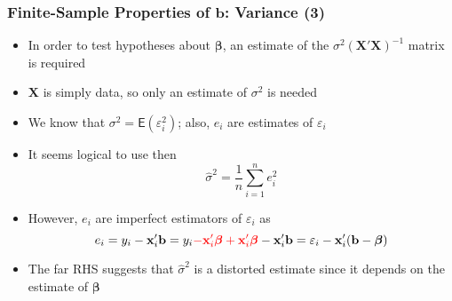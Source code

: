 \documentclass[10pt]{beamer}
\newcommand{\var}{\mathsf{Var}}
\newcommand{\E}{\mathsf{E}}
\theoremstyle{definition}
\begin{document}
\iffalse
\begin{frame}[fragile]
	\frametitle{Finite-Sample Properties of $\mathbf{b}$: Estimation of Variance}
	\begin{itemize}
		\item In the empirical context, the unbiased estimator of the (conditional and unconditional) variance of $\mathbf{b}$ is:
		\[
		\var(\mathbf{b|X}) = \var(\mathbf{b}) = s^{2}(\mathbf{X'X})^{-1}
		\]
		where $s^{2} = \displaystyle \frac{\mathbf{e'e}}{n-k}$ 
		\item Because of the fact that the estimator $\mathbf{b}$ is a linear function of $\bm\varepsilon$, then if $\bm\varepsilon$ is multivariate normal, then:
		\[
		\mathbf{b|X} \sim \mathcal{N}(\bm\beta, \sigma^{2}(\mathbf{X'X})^{-1})
		\]
	\end{itemize}
\end{frame}
\fi

\begin{frame}[fragile]
\frametitle{Finite-Sample Properties of $\mathbf{b}$: Variance (3)}
\begin{itemize}
	\item In order to test hypotheses about $\boldsymbol\beta$, an estimate of the $\sigma^{2}\mathbf{(X'X)}^{-1}$ matrix is required
	\item $\mathbf{X}$ is simply data, so only an estimate of $\sigma^{2}$ is needed
	\item We know that $\sigma^{2} = \E(\varepsilon_{i}^{2})$; also, $e_{i}$ are estimates of $\varepsilon_{i}$
	\item It seems logical to use then
	\[
		\widehat{\sigma}^{2} = \dfrac{1}{n}\sum_{i=1}^{n}e_{i}^{2}
	\]
	\item However, $e_{i}$ are imperfect estimators of $\varepsilon_{i}$ as
	\[
		e_{i} = y_{i} - \mathbf{x}_{i}'\mathbf{b} = y_{i} \textcolor{red}{- \mathbf{x}_{i}'\boldsymbol\beta +  \mathbf{x}_{i}'\boldsymbol\beta} - \mathbf{x}_{i}'\mathbf{b} = \varepsilon_{i} - \mathbf{x}_{i}'(\mathbf{b} - \boldsymbol\beta)
	\]
	\item The far RHS suggests that $\widehat{\sigma}^{2}$ is a distorted estimate since it depends on the estimate of $\boldsymbol\beta$
\end{itemize}
\end{frame}
\end{document}
